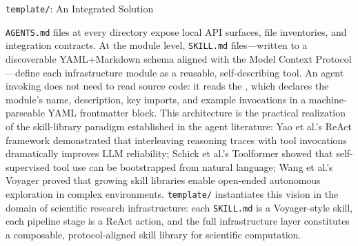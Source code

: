 \documentclass[
  ignorenonframetext,
]{beamer}
\begin{document}
\begin{frame}{\texttt{template/}: An
Integrated Solution}
\begin{enumerate}
  \texttt{AGENTS.md} files at every directory expose local API surfaces,
  file inventories, and integration contracts. At the module level,
  \texttt{SKILL.md} files---written to a discoverable YAML+Markdown
  schema aligned with the Model Context Protocol
  ---define each infrastructure module as a
  reusable, self-describing tool. An agent invoking
   does not need to read source code:
  it reads the , which declares the module's
  name, description, key imports, and example invocations in a
  machine-parseable YAML frontmatter block. This architecture is the
  practical realization of the skill-library paradigm established in the
  agent literature: Yao et al.'s ReAct framework 
  demonstrated that interleaving reasoning traces with tool invocations
  dramatically improves LLM reliability; Schick et al.'s Toolformer
   showed that self-supervised tool use can
  be bootstrapped from natural language; Wang et al.'s Voyager
   proved that growing skill libraries enable
  open-ended autonomous exploration in complex environments.
  \texttt{template/} instantiates this vision in the domain of
  scientific research infrastructure: each \texttt{SKILL.md} is a
  Voyager-style skill, each pipeline stage is a ReAct action, and the
  full infrastructure layer constitutes a composable, protocol-aligned
  skill library for scientific computation.
\end{enumerate}
\end{frame}
\end{document}
